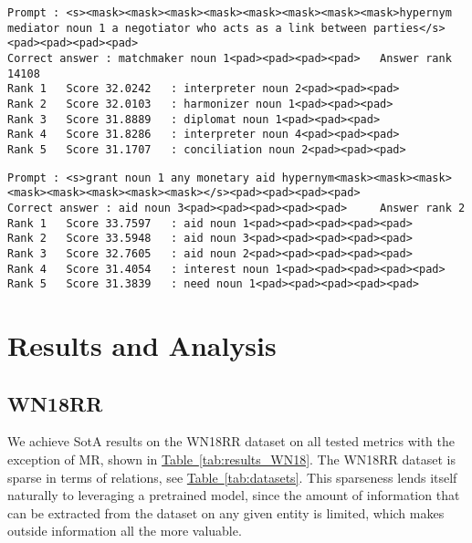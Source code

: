 \documentclass[11pt,a4paper]{article}
\newcommand{\RefTable}[1]{\hyperref[#1]{Table~\ref{#1}}}
\begin{document}
\begin{lstlisting}[float=*,basicstyle=\ttfamily\small,breaklines=true,label={lst:example1},caption={
Example of an error of the model on WN18RR. Shown are the top 5 ranked entities by the model with the score assigned to them.
The correct answer, \texttt{matchmaker noun 1}, was ranked 14,108 by the system.
}]
Prompt : <s><mask><mask><mask><mask><mask><mask><mask><mask>hypernym mediator noun 1 a negotiator who acts as a link between parties</s><pad><pad><pad><pad>
Correct answer : matchmaker noun 1<pad><pad><pad><pad> 	 Answer rank 14108
Rank 1	 Score 32.0242	 : interpreter noun 2<pad><pad><pad>
Rank 2	 Score 32.0103	 : harmonizer noun 1<pad><pad><pad>
Rank 3	 Score 31.8889	 : diplomat noun 1<pad><pad><pad>
Rank 4	 Score 31.8286	 : interpreter noun 4<pad><pad><pad>
Rank 5	 Score 31.1707	 : conciliation noun 2<pad><pad><pad>
\end{lstlisting}


\begin{lstlisting}[float=*,basicstyle=\ttfamily\small,breaklines=true,label={lst:example2},caption={
Example of a disambiguation error of the model on WN18RR. Shown are the top 5 ranked entities by the model with the score assigned to them.
The correct answer, \texttt{aid noun 3}, was ranked second by the system, after \texttt{aid noun 1}.
}]
Prompt : <s>grant noun 1 any monetary aid hypernym<mask><mask><mask><mask><mask><mask><mask><mask></s><pad><pad><pad><pad>
Correct answer : aid noun 3<pad><pad><pad><pad><pad> 	 Answer rank 2
Rank 1	 Score 33.7597	 : aid noun 1<pad><pad><pad><pad><pad>
Rank 2	 Score 33.5948	 : aid noun 3<pad><pad><pad><pad><pad>
Rank 3	 Score 32.7605	 : aid noun 2<pad><pad><pad><pad><pad>
Rank 4	 Score 31.4054	 : interest noun 1<pad><pad><pad><pad><pad>
Rank 5	 Score 31.3839	 : need noun 1<pad><pad><pad><pad><pad>
\end{lstlisting}


\section{Results and Analysis}
\subsection{WN18RR}

We achieve SotA results on the WN18RR dataset on all tested metrics with the exception of MR, shown in \RefTable{tab:results_WN18}.
The WN18RR dataset is sparse in terms of relations, see \RefTable{tab:datasets}.
This sparseness lends itself naturally to leveraging a pretrained model, since the amount of information that can be extracted from the dataset on any given entity is limited, which makes outside information all the more valuable.
\end{document}
